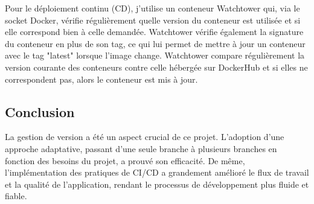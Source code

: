 Pour le déploiement continu (CD), j'utilise un conteneur Watchtower qui, via le socket Docker,
vérifie régulièrement quelle version du conteneur est utilisée et si elle correspond bien à celle demandée.
Watchtower vérifie également la signature du conteneur en plus de son tag,
ce qui lui permet de mettre à jour un conteneur avec le tag "latest" lorsque l'image change.
Watchtower compare régulièrement la version courante des conteneurs contre celle hébergée sur DockerHub et si elles ne correspondent pas,
alors le conteneur est mis à jour.

\subsection{Conclusion}\label{subsec:conclusion}

La gestion de version a été un aspect crucial de ce projet.
L'adoption d'une approche adaptative, passant d'une seule branche à plusieurs branches en fonction des besoins du projet, a prouvé son efficacité.
De même, l'implémentation des pratiques de CI/CD a grandement amélioré le flux de travail et la qualité de
l'application, rendant le processus de développement plus fluide et fiable.